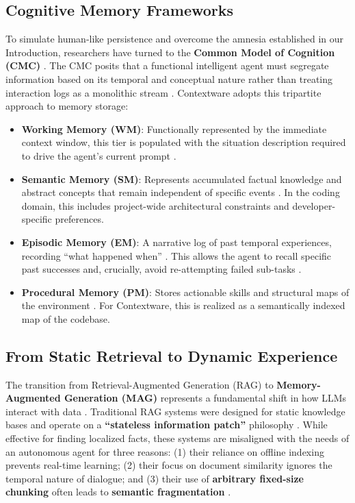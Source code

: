\documentclass[conference]{IEEEtran}
\begin{document}
\subsection{Cognitive Memory Frameworks}
To simulate human-like persistence and overcome the amnesia established in our Introduction, researchers have turned to the \textbf{Common Model of Cognition (CMC)} \cite{Hatalis2024Memory}. The CMC posits that a functional intelligent agent must segregate information based on its temporal and conceptual nature rather than treating interaction logs as a monolithic stream \cite{Zhang2024A}. Contextware adopts this tripartite approach to memory storage:
\begin{itemize}
    \item \textbf{Working Memory (WM)}: Functionally represented by the immediate context window, this tier is populated with the situation description required to drive the agent's current prompt \cite{Hatalis2024Memory}.
    \item \textbf{Semantic Memory (SM)}: Represents accumulated factual knowledge and abstract concepts that remain independent of specific events \cite{Xu2025A-MEM:}. In the coding domain, this includes project-wide architectural constraints and developer-specific preferences.
    \item \textbf{Episodic Memory (EM)}: A narrative log of past temporal experiences, recording ``what happened when'' \cite{Wang2025MIRIX:}. This allows the agent to recall specific past successes and, crucially, avoid re-attempting failed sub-tasks \cite{Xu2025Memory}.
    \item \textbf{Procedural Memory (PM)}: Stores actionable skills and structural maps of the environment \cite{Zhang2024CodeAgent}. For Contextware, this is realized as a semantically indexed map of the codebase.
\end{itemize}

\subsection{From Static Retrieval to Dynamic Experience}
The transition from Retrieval-Augmented Generation (RAG) to \textbf{Memory-Augmented Generation (MAG)} represents a fundamental shift in how LLMs interact with data \cite{Nan2025Nemori:}. Traditional RAG systems were designed for static knowledge bases and operate on a \textbf{``stateless information patch''} philosophy \cite{Nan2025Nemori:}. While effective for finding localized facts, these systems are misaligned with the needs of an autonomous agent for three reasons: (1) their reliance on offline indexing prevents real-time learning; (2) their focus on document similarity ignores the temporal nature of dialogue; and (3) their use of \textbf{arbitrary fixed-size chunking} often leads to \textbf{semantic fragmentation} \cite{Nan2025Nemori:}. 
\end{document}
